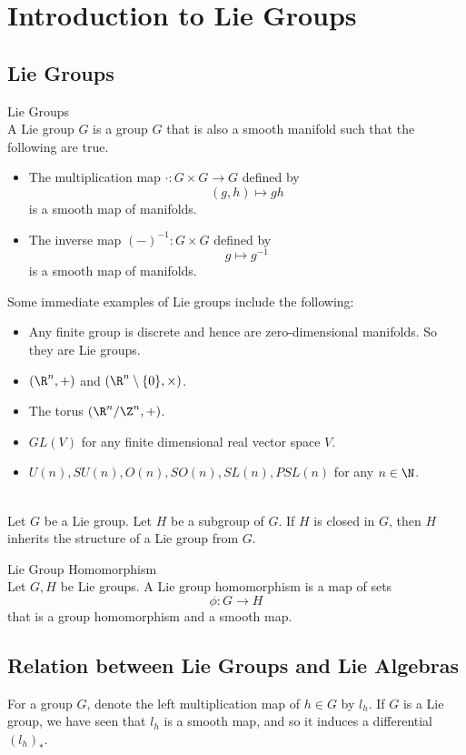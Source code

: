 \documentclass[a4paper]{article}
\begin{document}
\pagebreak
\section{Introduction to Lie Groups}
\subsection{Lie Groups}
\begin{defn}{Lie Groups}{} \\A Lie group $G$ is a group $G$ that is also a smooth manifold such that the following are true. 
\begin{itemize}
\item The multiplication map $\cdot:G\times G\to G$ defined by $$(g,h)\mapsto gh$$ is a smooth map of manifolds. 
\item The inverse map $(-)^{-1}:G\times G$ defined by $$g\mapsto g^{-1}$$ is a smooth map of manifolds. 
\end{itemize}
\end{defn}

Some immediate examples of Lie groups include the following: 
\begin{itemize}
\item Any finite group is discrete and hence are zero-dimensional manifolds. So they are Lie groups. 
\item $(\R^n,+)$ and $(\R^n\setminus\{0\},\times)$. 
\item The torus $(\R^n/\Z^n,+)$. 
\item $GL(V)$ for any finite dimensional real vector space $V$. 
\item $U(n), SU(n), O(n), SO(n), SL(n), PSL(n)$ for any $n\in\N$. 
\end{itemize}

\begin{prp}{}{} \\Let $G$ be a Lie group. Let $H$ be a subgroup of $G$. If $H$ is closed in $G$, then $H$ inherits the structure of a Lie group from $G$. 
\end{prp}

\begin{defn}{Lie Group Homomorphism}{} \\Let $G,H$ be Lie groups. A Lie group homomorphism is a map of sets $$\phi:G\to H$$ that is a group homomorphism and a smooth map. 
\end{defn}

\subsection{Relation between Lie Groups and Lie Algebras}
For a group $G$, denote the left multiplication map of $h\in G$ by $l_h$. If $G$ is a Lie group, we have seen that $l_h$ is a smooth map, and so it induces a differential $(l_h)_\ast$. 
\end{document}
